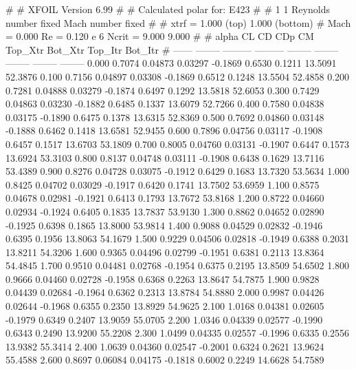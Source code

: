 #  
#       XFOIL         Version 6.99
#  
# Calculated polar for: E423                                            
#  
# 1 1 Reynolds number fixed          Mach number fixed         
#  
# xtrf =   1.000 (top)        1.000 (bottom)  
# Mach =   0.000     Re =     0.120 e 6     Ncrit =   9.000  9.000
#  
#   alpha    CL        CD       CDp       CM     Top_Xtr  Bot_Xtr  Top_Itr  Bot_Itr
#  ------ -------- --------- --------- -------- -------- -------- -------- --------
   0.000   0.7074   0.04873   0.03297  -0.1869   0.6530   0.1211  13.5091  52.3876
   0.100   0.7156   0.04897   0.03308  -0.1869   0.6512   0.1248  13.5504  52.4858
   0.200   0.7281   0.04888   0.03279  -0.1874   0.6497   0.1292  13.5818  52.6053
   0.300   0.7429   0.04863   0.03230  -0.1882   0.6485   0.1337  13.6079  52.7266
   0.400   0.7580   0.04838   0.03175  -0.1890   0.6475   0.1378  13.6315  52.8369
   0.500   0.7692   0.04860   0.03148  -0.1888   0.6462   0.1418  13.6581  52.9455
   0.600   0.7896   0.04756   0.03117  -0.1908   0.6457   0.1517  13.6703  53.1809
   0.700   0.8005   0.04760   0.03131  -0.1907   0.6447   0.1573  13.6924  53.3103
   0.800   0.8137   0.04748   0.03111  -0.1908   0.6438   0.1629  13.7116  53.4389
   0.900   0.8276   0.04728   0.03075  -0.1912   0.6429   0.1683  13.7320  53.5634
   1.000   0.8425   0.04702   0.03029  -0.1917   0.6420   0.1741  13.7502  53.6959
   1.100   0.8575   0.04678   0.02981  -0.1921   0.6413   0.1793  13.7672  53.8168
   1.200   0.8722   0.04660   0.02934  -0.1924   0.6405   0.1835  13.7837  53.9130
   1.300   0.8862   0.04652   0.02890  -0.1925   0.6398   0.1865  13.8000  53.9814
   1.400   0.9088   0.04529   0.02832  -0.1946   0.6395   0.1956  13.8063  54.1679
   1.500   0.9229   0.04506   0.02818  -0.1949   0.6388   0.2031  13.8211  54.3206
   1.600   0.9365   0.04496   0.02799  -0.1951   0.6381   0.2113  13.8364  54.4845
   1.700   0.9510   0.04481   0.02768  -0.1954   0.6375   0.2195  13.8509  54.6502
   1.800   0.9666   0.04460   0.02728  -0.1958   0.6368   0.2263  13.8647  54.7875
   1.900   0.9828   0.04439   0.02684  -0.1964   0.6362   0.2313  13.8784  54.8880
   2.000   0.9987   0.04426   0.02644  -0.1968   0.6355   0.2350  13.8929  54.9625
   2.100   1.0168   0.04381   0.02605  -0.1979   0.6349   0.2407  13.9059  55.0705
   2.200   1.0346   0.04339   0.02577  -0.1990   0.6343   0.2490  13.9200  55.2208
   2.300   1.0499   0.04335   0.02557  -0.1996   0.6335   0.2556  13.9382  55.3414
   2.400   1.0639   0.04360   0.02547  -0.2001   0.6324   0.2621  13.9624  55.4588
   2.600   0.8697   0.06084   0.04175  -0.1818   0.6002   0.2249  14.6628  54.7589
